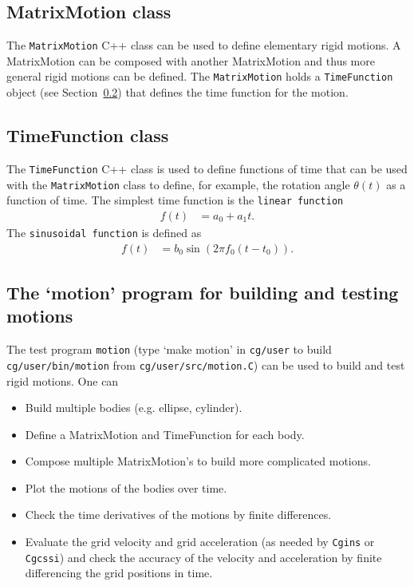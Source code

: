 \subsection{MatrixMotion class} \label{sec:MatrixMotion}

The {\tt MatrixMotion} C++ class can be used to define elementary rigid motions. A MatrixMotion
can be composed with another MatrixMotion and thus more general rigid motions can be defined.
The {\tt MatrixMotion} holds a {\tt TimeFunction} object (see Section~\ref{sec:TimeFunction}) that
defines the time function for the motion.



\subsection{TimeFunction class} \label{sec:TimeFunction}

The {\tt TimeFunction} C++ class is used to define functions of time that can be used with the
{\tt MatrixMotion} class to define, for example, the rotation angle $\theta(t)$ as a function of time.
The simplest time function is the {\tt linear function}
\begin{align}
  f(t) &= a_0 + a_1 t.
\end{align}
The {\tt sinusoidal function} is defined as
\begin{align}
  f(t) &= b_0 \sin( 2 \pi f_0( t-t_0)) .
\end{align}




\subsection{The `motion' program for building and testing motions} \label{sec:motion}

The test program {\tt motion} (type `make motion' in {\tt cg/user} to build 
{\tt cg/user/bin/motion} from {\tt cg/user/src/motion.C}) 
can be used to build and test rigid motions. One can
\begin{itemize}
  \item Build multiple bodies (e.g. ellipse, cylinder).
  \item Define a MatrixMotion and TimeFunction for each body.
  \item Compose multiple MatrixMotion's to build more complicated motions.
  \item Plot the motions of the bodies over time.
  \item Check the time derivatives of the motions by finite differences. 
  \item Evaluate the grid velocity and grid acceleration (as needed by {\tt Cgins} or {\tt Cgcssi})
        and check the accuracy of the velocity and acceleration by finite differencing the grid positions
        in time. 
\end{itemize}



